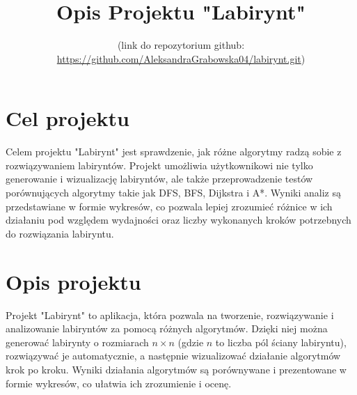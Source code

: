 \documentclass{article}
\title{Opis Projektu "Labirynt" \\ }
\author{(link do repozytorium github: \\ \url{https://github.com/AleksandraGrabowska04/labirynt.git})}
\begin{document}
\maketitle

\section{Cel projektu}
Celem projektu "Labirynt" jest sprawdzenie, jak różne algorytmy radzą sobie z rozwiązywaniem labiryntów. Projekt umożliwia użytkownikowi nie tylko generowanie i wizualizację labiryntów, ale także przeprowadzenie testów porównujących algorytmy takie jak DFS, BFS, Dijkstra i A*. Wyniki analiz są przedstawiane w formie wykresów, co pozwala lepiej zrozumieć różnice w ich działaniu pod względem wydajności oraz liczby wykonanych kroków potrzebnych do rozwiązania labiryntu.

\section{Opis projektu}
Projekt "Labirynt" to aplikacja, która pozwala na tworzenie, rozwiązywanie i analizowanie labiryntów za pomocą różnych algorytmów. Dzięki niej można generować labirynty o rozmiarach \(n \times n\) (gdzie \(n\) to liczba pól ściany labiryntu), rozwiązywać je automatycznie, a następnie wizualizować działanie algorytmów krok po kroku. Wyniki działania algorytmów są porównywane i prezentowane w formie wykresów, co ułatwia ich zrozumienie i ocenę.
\end{document}

